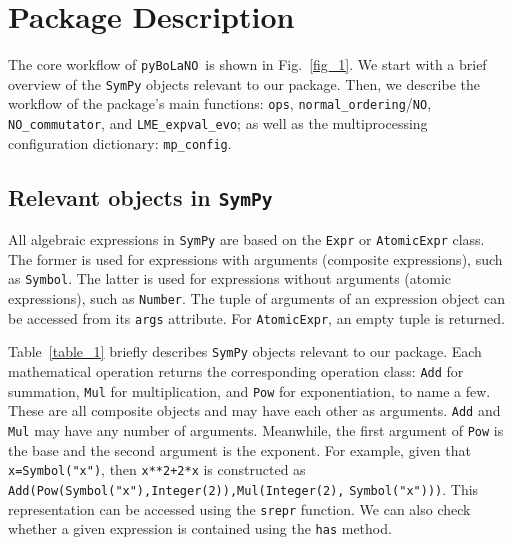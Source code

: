 \documentclass[onecolumn, 12pt, sort&compress]{elsarticle}
\newcommand{\inlinecode}[1]{\texttt{#1}}
\newcommand{\pybolano}{\texttt{pyBoLaNO}~}
\begin{document}

\section{Package Description}\label{section:package_anatomy}

The core workflow of \pybolano is shown in Fig.~\ref{fig_1}. We start with a brief overview of the \texttt{SymPy} objects relevant to our package. Then, we describe the workflow of the package's main functions: \inlinecode{ops}, \inlinecode{normal_ordering}/\inlinecode{NO}, \inlinecode{NO_commutator}, and \inlinecode{LME_expval_evo}; as well as the multiprocessing configuration dictionary: \inlinecode{mp_config}.

\subsection{Relevant objects in \texttt{SymPy}}
\label{subsec_sympy_objects}

All algebraic expressions in \texttt{SymPy} are based on the \inlinecode{Expr} or \inlinecode{AtomicExpr} class. The former is used for expressions with arguments (composite expressions), such as \inlinecode{Symbol}. The latter is used for expressions without arguments (atomic expressions), such as \inlinecode{Number}. The tuple of arguments of an expression object can be accessed from its \inlinecode{args} attribute.  For \inlinecode{AtomicExpr}, an empty tuple is returned.

Table~\ref{table_1} briefly describes \texttt{SymPy} objects relevant to our package. Each mathematical operation returns the corresponding operation class: \inlinecode{Add} for summation, \inlinecode{Mul} for multiplication, and \inlinecode{Pow} for exponentiation, to name a few. These are all composite objects and may have each other as arguments. \inlinecode{Add} and \inlinecode{Mul} may have any number of arguments. Meanwhile, the first argument of \inlinecode{Pow} is the base and the second argument is the exponent.  For example, given that \inlinecode{x=Symbol("x")}, then \inlinecode{x**2+2*x} is constructed as \inlinecode{Add(Pow(Symbol("x"),Integer(2)),Mul(Integer(2),} \inlinecode{Symbol("x")))}. This representation can be accessed using the \inlinecode{srepr} function. We can also check whether a given expression is contained using the \inlinecode{has} method.
\end{document}
